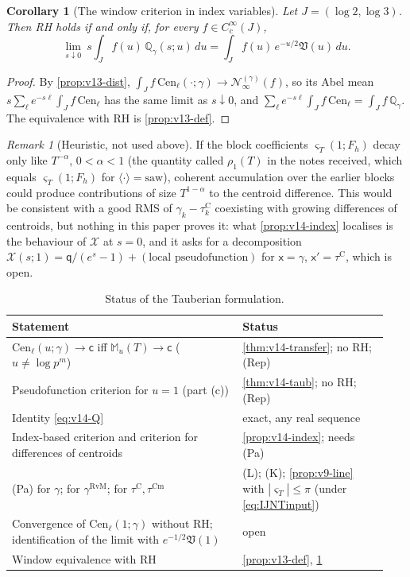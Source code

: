 \documentclass[11pt,a4paper]{article}
\numberwithin{equation}{section}
\newtheorem{corollary}[theorem]{Corollary}
\theoremstyle{definition}
\theoremstyle{remark}
\newtheorem{remark}[theorem]{Remark}
\newcommand{\Cm}{\mathrm{Cm}}
\begin{document}
\begin{corollary}[The window criterion in index variables]\label{cor:v14-window}
Let $J=(\log2,\log3)$. Then RH holds if and only if, for every $f\in C_c^\infty(J)$,
\begin{equation}
\lim_{s\downarrow0}\ s\int_Jf(u)\,\mathbb Q_\gamma(s;u)\,du=\int_Jf(u)\,e^{-u/2}\mathfrak V(u)\,du .
\end{equation}
\end{corollary}
\begin{proof}
By \cref{prop:v13-dist}, $\int_Jf\,\mathrm{Cen}_\ell(\cdot;\gamma)\to\mathscr N^{(\gamma)}_\infty(f)$, so its Abel mean $s\sum_\ell e^{-s\ell}\int_Jf\,\mathrm{Cen}_\ell$ has the same limit as $s\downarrow0$, and $\sum_\ell e^{-s\ell}\int_Jf\,\mathrm{Cen}_\ell=\int_Jf\,\mathbb Q_\gamma$. The equivalence with RH is \cref{prop:v13-def}.
\end{proof}

\begin{remark}[Heuristic, not used above]
If the block coefficients $\varsigma_T(1;F_h)$ decay only like $T^{-\alpha}$, $0<\alpha<1$ (the quantity called $\rho_1(T)$ in the notes received, which equals $\varsigma_T(1;F_h)$ for $\langle\cdot\rangle=\mathrm{saw}$), coherent accumulation over the earlier blocks could produce contributions of size $T^{1-\alpha}$ to the centroid difference. This would be consistent with a good RMS of $\gamma_k-\tau^{\mathrm C}_k$ coexisting with growing differences of centroids, but nothing in this paper proves it: what \cref{prop:v14-index} localises is the behaviour of $\mathscr X$ at $s=0$, and it asks for a decomposition $\mathscr X(s;1)=\mathsf q/(e^s-1)+(\text{local pseudofunction})$ for $\mathsf x=\gamma$, $\mathsf x'=\tau^{\mathrm C}$, which is open.
\end{remark}

\begin{table}[ht]
\centering\small
\begin{tabular}{@{}p{0.58\linewidth}p{0.36\linewidth}@{}}
\toprule
Statement & Status\\
\midrule
$\mathrm{Cen}_\ell(u;\gamma)\to\mathsf c$ iff $\mathbb M_u(T)\to\mathsf c$ ($u\ne\log p^m$) & \cref{thm:v14-transfer}; no RH; (Rep)\\
Pseudofunction criterion for $u=1$ (part (c)) & \cref{thm:v14-taub}; no RH; (Rep)\\
Identity \eqref{eq:v14-Q} & exact, any real sequence\\
Index-based criterion and criterion for differences of centroids & \cref{prop:v14-index}; needs (Pa)\\
(Pa) for $\gamma$; for $\gamma^{\mathrm{RvM}}$; for $\tau^{\mathrm C},\tau^{\Cm}$ & (L); (K); \cref{prop:v9-line} with $|\varsigma_T|\le\pi$ (under \eqref{eq:IJNTinput})\\
Convergence of $\mathrm{Cen}_\ell(1;\gamma)$ without RH; identification of the limit with $e^{-1/2}\mathfrak V(1)$ & open\\
Window equivalence with RH & \cref{prop:v13-def}, \cref{cor:v14-window}\\
\bottomrule
\end{tabular}
\caption{Status of the Tauberian formulation.}
\label{tab:v14-status}
\end{table}
\end{document}
